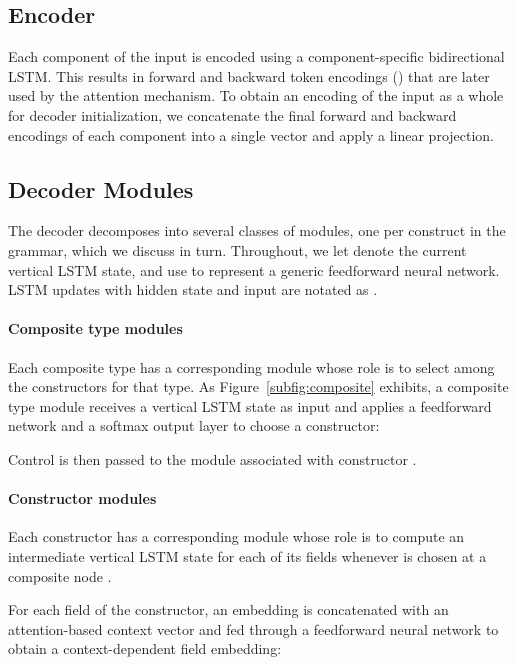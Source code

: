 \documentclass[11pt,a4paper]{article}
\begin{document}
\subsection{Encoder}\label{subsec:encoder}

Each component  of the input is encoded using a component-specific bidirectional LSTM. This results in forward and backward token encodings () that are later used by the attention mechanism. To obtain an encoding of the input as a whole for decoder initialization, we concatenate the final forward and backward encodings of each component into a single vector and apply a linear projection.

\subsection{Decoder Modules}\label{subsec:decoder-modules}

The decoder decomposes into several classes of modules, one per construct in the grammar, which we discuss in turn. Throughout, we let  denote the current vertical LSTM state, and use  to represent a generic feedforward neural network. LSTM updates with hidden state  and input  are notated as .

\paragraph{Composite type modules} Each composite type  has a corresponding module whose role is to select among the constructors  for that type. As Figure~\ref{subfig:composite} exhibits, a composite type module receives a vertical LSTM state  as input and applies a feedforward network  and a softmax output layer to choose a constructor:

Control is then passed to the module associated with constructor .

\paragraph{Constructor modules} Each constructor  has a corresponding module whose role is to compute an intermediate vertical LSTM state  for each of its fields  whenever  is chosen at a composite node . 



For each field  of the constructor, an embedding  is concatenated with an attention-based context vector  and fed through a feedforward neural network  to obtain a context-dependent field embedding:
\end{document}
